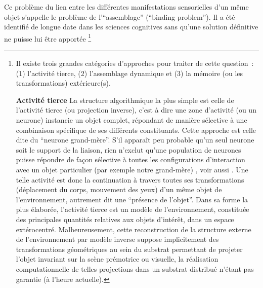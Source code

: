 \documentclass[11pt]{article}
\begin{document}
	Ce problème du lien entre les différentes manifestations sensorielles d'un même objet s'appelle le problème de l'``assemblage'' (``binding problem''). Il a été identifié de longue date dans les sciences cognitives sans qu'une solution définitive ne  puisse lui être apportée \footnote{	
Il existe trois grandes catégories d'approches pour traiter de cette question~: (1) l'activité tierce, (2) l'assemblage
dynamique et (3) la mémoire (ou les transformations) extérieure(s).

{\bf Activité tierce}	La structure algorithmique la plus simple est celle de l'activité tierce (ou  projection inverse), 
c'est à 
dire une zone d'activité (ou un neurone) instancie un objet complet, répondant 
de manière sélective à une combinaison spécifique de ses différents constituants.
Cette approche est celle dite du ``neurone grand-mère''. 
S'il apparaît peu probable qu'un seul neurone soit le support de la liaison,
rien n'exclut qu'une population de neurones puisse répondre de façon sélective
à toutes les configurations d'interaction avec un objet particulier (par exemple
notre grand-mère) , voir aussi .
Une telle activité est donc la continuation à travers
toutes ses transformations (déplacement du corps, mouvement des yeux) 
d'un même objet de l'environnement,
autrement dit une ``présence de l'objet''.
Dans sa forme la plus élaborée, l'activité tierce est 
un modèle de l'environnement, constituée des principales quantités 
relatives aux objets d'intérêt, dans un espace extérocentré. 
Malheureusement, cette reconstruction de la structure externe de l'environnement 
par modèle inverse suppose implicitement des transformations géométriques au sein
du substrat permettant de projeter l'objet invariant sur la scène prémotrice ou visuelle,
la réalisation computationnelle de telles projections dans un substrat distribué n'étant pas garantie
(à l'heure actuelle).

}
\end{document}
